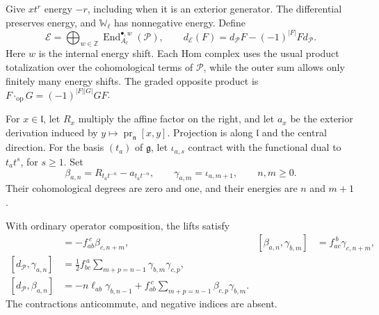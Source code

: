 Give $xt^r$ energy $-r$, including when it is an exterior generator.
The differential preserves energy, and $\mathbb W_\ell$ has
nonnegative energy. Define
\begin{equation}\label{cyrec:eq:endomorphisms}
 \mathcal E=\bigoplus_{w\in\mathbb Z}
      \operatorname{End}_{A_\ell}^{\bullet,w}(\mathcal P),
 \qquad
 d_{\mathcal E}(F)=d_{\mathcal P}F-(-1)^{|F|}Fd_{\mathcal P}.
\end{equation}
Here $w$ is the internal energy shift. Each Hom complex uses the
usual product totalization over the cohomological terms of
$\mathcal P$, while the outer sum allows only finitely many energy
shifts. The graded opposite product is
$F\cdot_{\mathrm{op}}G=(-1)^{|F||G|}GF$.

For $x\in\mathfrak l$, let $R_x$ multiply the affine factor on
the right, and let $a_x$ be the exterior derivation induced by
$y\mapsto\operatorname{pr}_{\mathfrak n}[x,y]$.
Projection is along $\mathfrak l$ and the central direction.
For the basis $(t_a)$ of $\mathfrak g$, let $\iota_{a,s}$
contract with the functional dual to $t_at^s$, for $s\geq1$.
Set
\begin{equation}\label{cyrec:eq:affine-lifts}
 \beta_{a,n}=R_{t_at^{-n}}-a_{t_at^{-n}},
 \qquad\gamma_{a,m}=\iota_{a,m+1},
 \qquad n,m\geq0.
\end{equation}
Their cohomological degrees are zero and one, and their energies
are $n$ and $m+1$.

\begin{lemma}\label{cyrec:lem:affine-lifts}
With ordinary operator composition, the lifts satisfy
\begin{align}
 [\beta_{a,n},\beta_{b,m}]&=-f_{ab}^{\ c}\beta_{c,n+m},
 & [\beta_{a,n},\gamma_{b,m}]&=f_{ac}^{\ b}\gamma_{c,n+m},
 \label{cyrec:eq:lift-brackets}\\
 [d_{\mathcal P},\gamma_{a,n}]
 &=\tfrac12f_{bc}^{\ a}\sum_{m+p=n-1}\gamma_{b,m}\gamma_{c,p},
 \label{cyrec:eq:lift-ghost}\\
 [d_{\mathcal P},\beta_{a,n}]
 &=-n\ell_{ab}\gamma_{b,n-1}
       +f_{ab}^{\ c}\sum_{m+p=n-1}\beta_{c,p}\gamma_{b,m}.
 \label{cyrec:eq:lift-even}
\end{align}
The contractions anticommute, and negative indices are absent.
\end{lemma}

